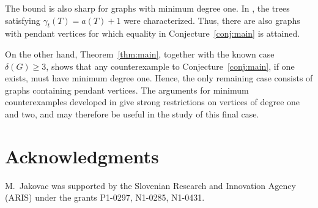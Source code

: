 \documentclass[12pt]{article}
\begin{document}
The bound is also sharp for graphs with minimum degree one. In \cite{DesormeauxHaynesHenning2013}, the trees satisfying $\gamma_t(T)=a(T)+1$ were characterized. Thus, there are also graphs with pendant vertices for which equality in Conjecture~\ref{conj:main} is attained.

On the other hand, Theorem~\ref{thm:main}, together with the known case $\delta(G)\ge 3$, shows that any counterexample to Conjecture~\ref{conj:main}, if one exists, must have minimum degree one. Hence, the only remaining case consists of graphs containing pendant vertices. The arguments for minimum counterexamples developed in \cite{BujtasJakovac2019} give strong restrictions on vertices of degree one and two, and may therefore be useful in the study of this final case.


\section*{Acknowledgments}

M.\ Jakovac was supported by the Slovenian Research and Innovation Agency (ARIS) under the grants P1-0297, N1-0285, N1-0431.






\end{document}
